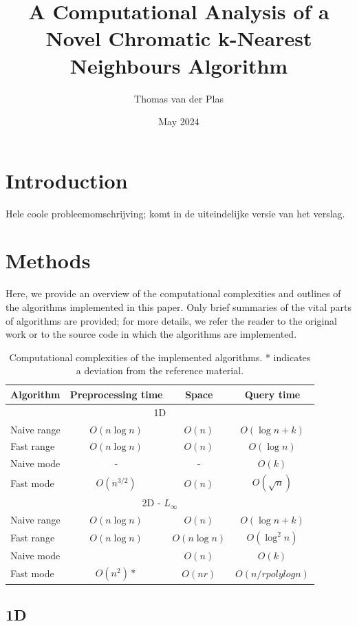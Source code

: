 \documentclass{article}
\title{A Computational Analysis of a Novel Chromatic k-Nearest Neighbours Algorithm}
\author{Thomas van der Plas}
\date{May 2024}
\begin{document}
\maketitle

\section{Introduction}
Hele coole probleemomschrijving; komt in de uiteindelijke versie van het verslag.

\section{Methods}
Here, we provide an overview of the computational complexities and outlines of the algorithms implemented in this paper. Only brief summaries of the vital parts of algorithms are provided; for more details, we refer the reader to the original work or to the source code in which the algorithms are implemented.
\begin{table}[h]
    \centering
    \begin{tabular}{|l|ccc|}
       \hline
       Algorithm & Preprocessing time & Space & Query time \\
       \hline
       \hline
       \multicolumn{4}{|c|}{1D} \\
       \hline
        Naive range & $O(n \log n)$ & $O(n)$ & $O(\log n + k)$ \\
        Fast range & $O(n \log n)$ & $O(n)$ & $O(\log n)$ \\
        Naive mode & - & - & $O(k)$ \\
        Fast mode & $O(n^{3/2})$ & $O(n)$ & $O(\sqrt{n})$ \\
        \hline
       \multicolumn{4}{|c|}{2D - $L_\infty$} \\
       \hline
        Naive range & $O(n \log n)$ & $O(n)$ & $O(\log n + k)$ \\
        Fast range & $O(n \log n)$ & $O(n \log n)$ & $O(\log^2 n)$ \\
        Naive mode &  & $O(n)$ & $O(k)$ \\
        Fast mode & $O(n^2)*$ & $O(nr)$ & $O(n/r \textit{polylog} n)$ \\
        \hline
       \hline
    \end{tabular}
    \caption{Computational complexities of the implemented algorithms. * indicates a deviation from the reference material.}
    \label{tab:runtimes}
\end{table}
\subsection{1D}
\end{document}

